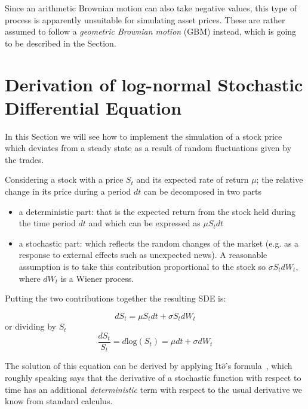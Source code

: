 Since an arithmetic Brownian motion can also take negative values, this type of process is apparently unsuitable for simulating asset prices. These are rather assumed to follow a \emph{geometric Brownian motion} (GBM) instead, which is going to be described in the Section. 

\section{Derivation of log-normal Stochastic Differential Equation}
\label{derivation-of-log-normal-stochastic-differential-equation}

In this Section we will see how to implement the simulation of a stock price which deviates from a steady state as a result of random fluctuations given by the trades. 

Considering a stock with a price \(S_t\) and its expected rate of return \(\mu\); the relative change in its price during a period \(dt\) can be decomposed in two parts

\begin{itemize}
	\tightlist
	\item
	a deterministic part: that is the expected return from the stock held
	during the time period \(dt\) and which can be expressed as \(\mu S_tdt\)
	\item
	a stochastic part: which reflects the random changes of the market
	(e.g. as a response to external effects such as unexpected news). A
	reasonable assumption is to take this contribution proportional to the
	stock so \(\sigma S_t dW_t\), where \(dW_t\) is a Wiener process.
\end{itemize}
Putting the two contributions together the resulting SDE is:

\begin{equation}
dS_t = \mu S_t dt + \sigma S_t dW_t
\label{eq:differential}
\end{equation}
or dividing by $S_t$
\begin{equation}
\frac{dS_t}{S_t} = d\textrm{log}(S_t) = \mu dt + \sigma dW_t
\label{eq:differential_relative}
\end{equation}

The solution of this equation can be derived by applying It\(\hat{o}\)'s formula~\cite{bib:ito_lemma}, which roughly speaking says that the derivative of a stochastic function with respect to time has an additional \emph{deterministic} term with respect to the usual derivative we know from standard calculus. 

